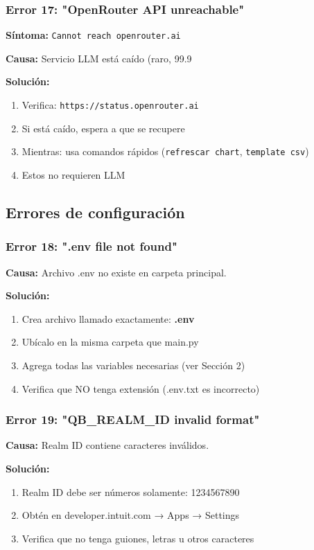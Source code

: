 \documentclass[12pt,oneside]{article}
\begin{document}
\subsubsection{Error 17: "OpenRouter API unreachable"}

\textbf{Síntoma:} \texttt{Cannot reach openrouter.ai}

\textbf{Causa:} Servicio LLM está caído (raro, 99.9%

\textbf{Solución:}
\begin{enumerate}
    \item Verifica: \texttt{https://status.openrouter.ai}
    \item Si está caído, espera a que se recupere
    \item Mientras: usa comandos rápidos (\texttt{refrescar chart}, \texttt{template csv})
    \item Estos no requieren LLM
\end{enumerate}

\subsection{Errores de configuración}

\subsubsection{Error 18: ".env file not found"}

\textbf{Causa:} Archivo .env no existe en carpeta principal.

\textbf{Solución:}
\begin{enumerate}
    \item Crea archivo llamado exactamente: \textbf{.env}
    \item Ubícalo en la misma carpeta que main.py
    \item Agrega todas las variables necesarias (ver Sección 2)
    \item Verifica que NO tenga extensión (.env.txt es incorrecto)
\end{enumerate}

\subsubsection{Error 19: "QB_REALM_ID invalid format"}

\textbf{Causa:} Realm ID contiene caracteres inválidos.

\textbf{Solución:}
\begin{enumerate}
    \item Realm ID debe ser números solamente: 1234567890
    \item Obtén en developer.intuit.com → Apps → Settings
    \item Verifica que no tenga guiones, letras u otros caracteres
\end{enumerate}
\end{document}
